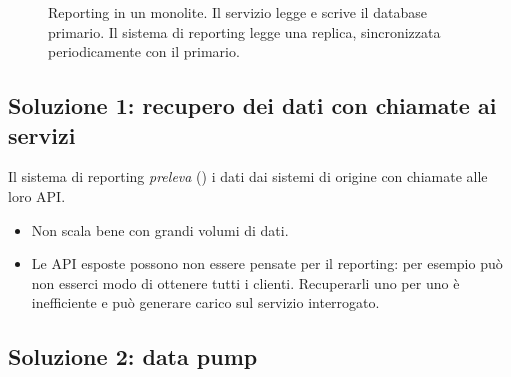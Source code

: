 \begin{figure}[ht]
\centering
{}
\caption{Reporting in un monolite. Il servizio legge e scrive il database primario. Il sistema di reporting legge una
replica, sincronizzata periodicamente con il primario.}
\label{fig:split-replica}
\end{figure}

\subsection{Soluzione 1: recupero dei dati con chiamate ai servizi}

Il sistema di reporting \emph{preleva} () i dati dai sistemi di origine con chiamate alle loro API.
\begin{itemize}
  \item Non scala bene con grandi volumi di dati.
  \item Le API esposte possono non essere pensate per il reporting: per esempio può non esserci modo di ottenere tutti
    i clienti. Recuperarli uno per uno è inefficiente e può generare carico sul servizio interrogato.
\end{itemize}

\subsection{Soluzione 2: data pump}

